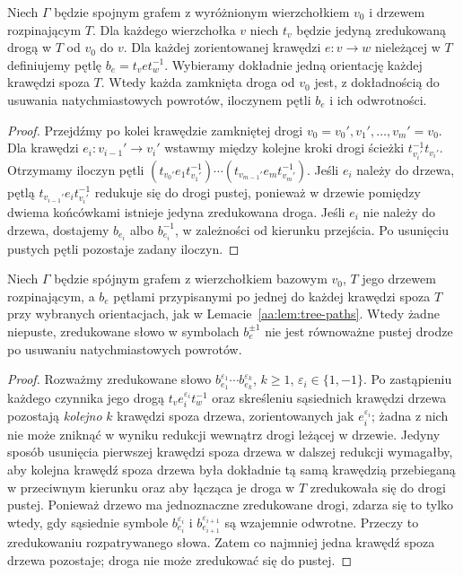 \begin{lemat}
\label{aa:lem:tree-paths}
Niech $\Gamma$ będzie spojnym grafem z wyróżnionym
wierzchołkiem $v_0$ i drzewem rozpinającym $T$.
Dla każdego wierzchołka $v$ niech $t_v$ będzie jedyną
zredukowaną drogą w $T$ od $v_0$ do $v$.
Dla każdej zorientowanej krawędzi $e:v\to w$ nieleżącej
w $T$ definiujemy pętlę $b_e=t_v e t_w^{-1}$.
Wybieramy dokładnie jedną orientację każdej krawędzi
spoza $T$. Wtedy każda zamknięta droga od $v_0$ jest,
z dokładnością do usuwania natychmiastowych powrotów,
iloczynem pętli $b_e$ i ich odwrotności.
\end{lemat}
\begin{proof}
Przejdźmy po kolei krawędzie zamkniętej drogi
$v_0=v_0',v_1',\dots,v_m'=v_0$.
Dla krawędzi $e_i:v_{i-1}'\to v_i'$ wstawmy
między kolejne kroki drogi ścieżki $t_{v_i'}^{-1}t_{v_i'}$.
Otrzymamy iloczyn pętli
$(t_{v_0'}e_1t_{v_1'}^{-1})\cdots
 (t_{v_{m-1}'}e_mt_{v_m'}^{-1})$.
Jeśli $e_i$ należy do drzewa, pętlą
$t_{v_{i-1}'}e_it_{v_i'}^{-1}$ redukuje się do drogi pustej,
ponieważ w drzewie pomiędzy dwiema końcówkami istnieje
jedyna zredukowana droga.
Jeśli $e_i$ nie należy do drzewa, dostajemy
$b_{e_i}$ albo $b_{e_i}^{-1}$, w zależności od kierunku przejścia.
Po usunięciu pustych pętli pozostaje zadany iloczyn.
\end{proof}

\begin{lemat}
\label{aa:lem:tree-free}
Niech $\Gamma$ będzie spójnym grafem z wierzchołkiem
bazowym $v_0$, $T$ jego drzewem rozpinającym, a $b_e$
pętlami przypisanymi po jednej do każdej krawędzi spoza $T$
przy wybranych orientacjach, jak w Lemacie~\ref{aa:lem:tree-paths}.
Wtedy żadne niepuste, zredukowane słowo w symbolach
$b_e^{\pm1}$ nie jest równoważne pustej drodze
po usuwaniu natychmiastowych powrotów.
\end{lemat}
\begin{proof}
Rozważmy zredukowane słowo
$b_{e_1}^{\varepsilon_1}\cdots b_{e_k}^{\varepsilon_k}$, $k\ge1$,
$\varepsilon_i\in\{1,-1\}$.
Po zastąpieniu każdego czynnika jego drogą
$t_v e_i^{\varepsilon_i}t_w^{-1}$ oraz skreśleniu
sąsiednich krawędzi drzewa pozostają \emph{kolejno}
$k$ krawędzi spoza drzewa, zorientowanych jak
$e_i^{\varepsilon_i}$; żadna z nich nie może zniknąć
w wyniku redukcji wewnątrz drogi leżącej w drzewie.
Jedyny sposób usunięcia pierwszej krawędzi spoza drzewa
w dalszej redukcji wymagałby, aby kolejna krawędź
spoza drzewa była dokładnie tą samą krawędzią przebieganą
w przeciwnym kierunku oraz aby łącząca je droga w $T$
zredukowała się do drogi pustej.
Ponieważ drzewo ma jednoznaczne zredukowane drogi,
zdarza się to tylko wtedy, gdy sąsiednie symbole
$b_{e_i}^{\varepsilon_i}$ i $b_{e_{i+1}}^{\varepsilon_{i+1}}$
są wzajemnie odwrotne. Przeczy to zredukowaniu
rozpatrywanego słowa. Zatem co najmniej jedna
krawędź spoza drzewa pozostaje; droga nie może
zredukować się do pustej.
\end{proof}

